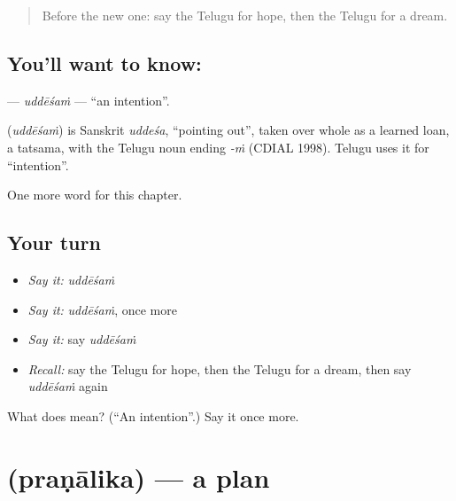 \label{lesson:TE-C107-uddesam}



\begin{quote}
Before the new one: say the Telugu for hope, then the Telugu for a dream.
\end{quote}

\subsection*{You'll want to know: }
\textbf{} — \emph{uddēśaṁ} — \textquotedblleft{}an intention\textquotedblright{}.

\begin{cousinweb}
\textbf{} (\emph{uddēśaṁ}) is Sanskrit \emph{uddeśa}, \textquotedblleft{}pointing out\textquotedblright{}, taken over whole as a learned loan, a tatsama, with the Telugu noun ending \emph{-ṁ} (CDIAL 1998). Telugu uses it for \textquotedblleft{}intention\textquotedblright{}.
\end{cousinweb}

\begin{grammarlens}[title={What you've built}]
One more word for this chapter.
\end{grammarlens}

\subsection*{Your turn}
\begin{itemize}
\raggedright
  \item \emph{Say it:} \emph{uddēśaṁ}
  \item \emph{Say it:} \emph{uddēśaṁ}, once more
  \item \emph{Say it:} say \emph{uddēśaṁ}
  \item \emph{Recall:} say the Telugu for hope, then the Telugu for a dream, then say \emph{uddēśaṁ} again
\end{itemize}

\begin{tcolorbox}[breakable,colback=teal!4,colframe=teal!35!black,title={Before you move on}]
What does  mean? (\textquotedblleft{}An intention\textquotedblright{}.) Say it once more.
\end{tcolorbox}
\section[\texorpdfstring{\te{ప్రణాళిక} (praṇālika)}{ప్రణాళిక (praṇālika)}]{ (praṇālika) — a plan}

